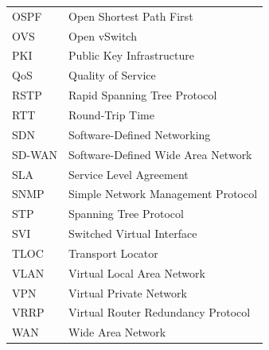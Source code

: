 {\begin{longtable}{ @{}p{3cm} p{12cm}@{} }
    OSPF & Open Shortest Path First \\
    OVS & Open vSwitch \\
    PKI & Public Key Infrastructure \\
    QoS & Quality of Service \\
    RSTP & Rapid Spanning Tree Protocol \\
    RTT & Round-Trip Time \\
    SDN & Software-Defined Networking \\
    SD-WAN & Software-Defined Wide Area Network \\
    SLA & Service Level Agreement \\
    SNMP & Simple Network Management Protocol \\
    STP & Spanning Tree Protocol \\
    SVI & Switched Virtual Interface \\
    TLOC & Transport Locator \\
    VLAN & Virtual Local Area Network \\
    VPN & Virtual Private Network \\
    VRRP & Virtual Router Redundancy Protocol \\
    WAN & Wide Area Network \\
\end{longtable}
}
